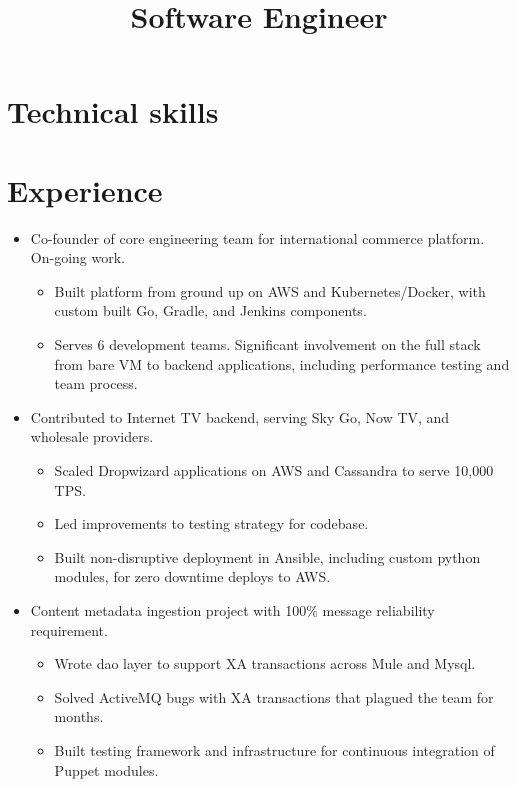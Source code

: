 \documentclass[11pt,a4paper,roman]{moderncv}
\title{Software Engineer}
\begin{document}
\makecvtitle

\section{Technical skills}

\section{Experience}

\begin{itemize}
\item Co-founder of core engineering team for international commerce platform. On-going work.
  \begin{itemize}
  \item Built platform from ground up on AWS and Kubernetes/Docker, with custom built Go, Gradle, and Jenkins components.
  \item Serves 6 development teams. Significant involvement on the full stack from bare VM to backend applications, including performance testing and team process.
  \end{itemize}
\item Contributed to Internet TV backend, serving Sky Go, Now TV, and wholesale providers.
  \begin{itemize}
  \item Scaled Dropwizard applications on AWS and Cassandra to serve 10,000 TPS.
  \item Led improvements to testing strategy for codebase.
  \item Built non-disruptive deployment in Ansible, including custom python modules, for zero downtime deploys to AWS.
  \end{itemize}
\item Content metadata ingestion project with 100\% message reliability requirement.
  \begin{itemize}
  \item Wrote dao layer to support XA transactions across Mule and Mysql.
  \item Solved ActiveMQ bugs with XA transactions that plagued the team for months.
  \item Built testing framework and infrastructure for continuous integration of Puppet modules.
  \end{itemize}
\end{itemize}
\end{document}
